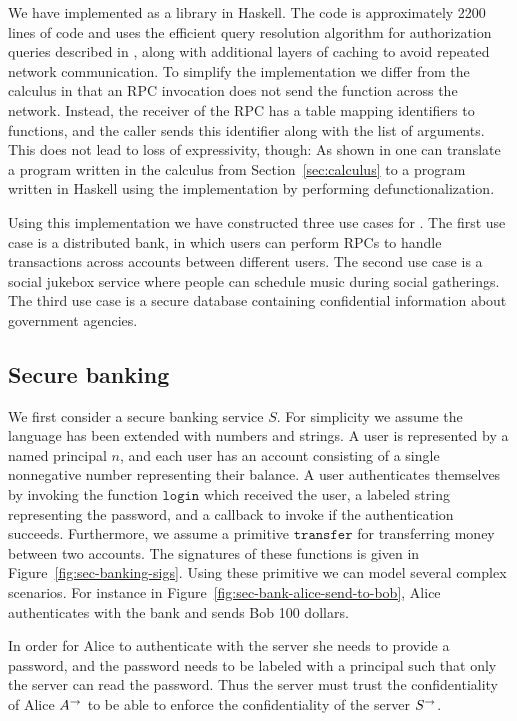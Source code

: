 We have implemented \lang{} as a library in Haskell. The code is approximately 2200 lines of code and uses the efficient query resolution algorithm for authorization queries described in \cite{Arden:2015:FA:2859845.2859998}, along with additional layers of caching to avoid repeated network communication. To simplify the implementation we differ from the calculus in that an RPC invocation does not send the function across the network. Instead, the receiver of the RPC has a table mapping identifiers to functions, and the caller sends this identifier along with the list of arguments. This does not lead to loss of expressivity, though: As shown in \cite{Cooper:2009:RC:1599410.1599439} one can translate a program written in the calculus from Section~\ref{sec:calculus} to a program written in Haskell using the \lang{} implementation by performing defunctionalization.

Using this implementation we have constructed three use cases for \lang. The first use case is a distributed bank, in which users can perform RPCs to handle transactions across accounts between different users. The second use case is a social jukebox service \cite{Sprague:2008:MSU:1385569.1385652} where people can schedule music during social gatherings. The third use case is a secure database containing confidential information about government agencies.

\subsection{Secure banking}
We first consider a secure banking service $S$. For simplicity we assume the language has been extended with numbers and strings. A user is represented by a named principal $n$, and each user has an account consisting of a single nonnegative number representing their balance. A user authenticates themselves by invoking the function $\mathtt{login}$ which received the user, a labeled string representing the password, and a callback to invoke if the authentication succeeds. Furthermore, we assume a primitive $\mathtt{transfer}$ for transferring money between two accounts. The signatures of these functions is given in Figure~\ref{fig:sec-banking-sigs}.
Using these primitive we can model several complex scenarios. For instance in Figure~\ref{fig:sec-bank-alice-send-to-bob}, Alice authenticates with the bank and sends Bob 100 dollars.

In order for Alice to authenticate with the server she needs to provide a password, and the password needs to be labeled with a principal such that only the server can read the password. Thus the server must trust the confidentiality of Alice $A^{\rightarrow}$ to be able to enforce the confidentiality of the server $S^{\rightarrow}$. 

